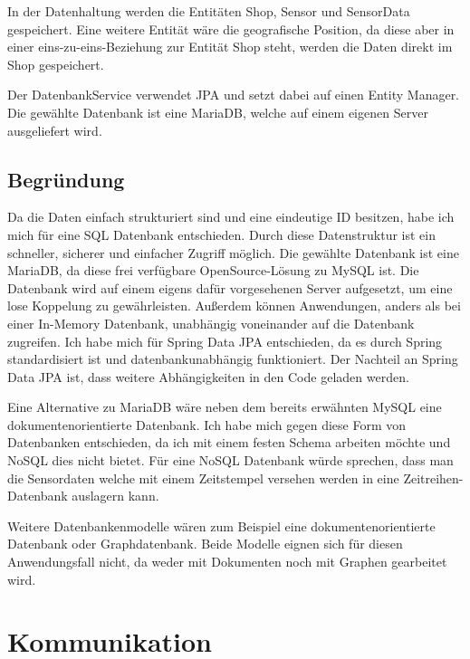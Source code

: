\documentclass[runningheads]{llncs}
\begin{document}
In der Datenhaltung werden die Entitäten Shop, Sensor und SensorData gespeichert.
Eine weitere Entität wäre die geografische Position, da diese aber in einer eins-zu-eins-Beziehung zur Entität Shop steht, werden die Daten direkt im Shop gespeichert.

Der DatenbankService verwendet JPA und setzt dabei auf einen Entity Manager.
Die gewählte Datenbank ist eine MariaDB, welche auf einem eigenen Server ausgeliefert wird.


\subsection{Begründung}
Da die Daten einfach strukturiert sind und eine eindeutige ID besitzen, habe ich mich für eine SQL Datenbank entschieden.
Durch diese Datenstruktur ist ein schneller, sicherer und einfacher Zugriff möglich.
Die gewählte Datenbank ist eine MariaDB, da diese frei verfügbare OpenSource-Lösung zu MySQL ist.
Die Datenbank wird auf einem eigens dafür vorgesehenen Server aufgesetzt, um eine lose Koppelung zu gewährleisten. Außerdem können Anwendungen, anders als bei einer In-Memory Datenbank, unabhängig voneinander auf die Datenbank zugreifen.
Ich habe mich für Spring Data JPA entschieden, da es durch Spring standardisiert ist und datenbankunabhängig funktioniert. Der Nachteil an Spring Data JPA ist, dass weitere Abhängigkeiten in den Code geladen werden.

Eine Alternative zu MariaDB wäre neben dem bereits erwähnten MySQL eine dokumentenorientierte Datenbank.
Ich habe mich gegen diese Form von Datenbanken entschieden, da ich mit einem festen Schema arbeiten möchte und NoSQL dies nicht bietet.
Für eine NoSQL Datenbank würde sprechen, dass man die Sensordaten welche mit einem Zeitstempel versehen werden in eine Zeitreihen-Datenbank auslagern kann.

Weitere Datenbankenmodelle wären zum Beispiel eine dokumentenorientierte Datenbank oder Graphdatenbank. Beide Modelle eignen sich für diesen Anwendungsfall nicht, da weder mit Dokumenten noch mit Graphen gearbeitet wird.
\newpage

\section{Kommunikation}
\end{document}

